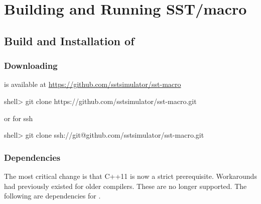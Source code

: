 
\chapter{Building and Running SST/macro}
\label{chapter:building}

\section{Build and Installation of \sstmacro}
\label{sec:buildinstall}


\subsection{Downloading}
\label{subsec:build:downloading}

\sstmacro is available at \url{https://github.com/sstsimulator/sst-macro}

\begin{ShellCmd}
shell> git clone https://github.com/sstsimulator/sst-macro.git 
\end{ShellCmd}
or for ssh

\begin{ShellCmd}
shell> git clone ssh://git@github.com/sstsimulator/sst-macro.git 
\end{ShellCmd}

\subsection{Dependencies}
\label{subsec:build:dependencies}
The most critical change is that C++11 is now a strict prerequisite. 
Workarounds had previously existed for older compilers. 
These are no longer supported.
The following are dependencies for \sstmacro.

